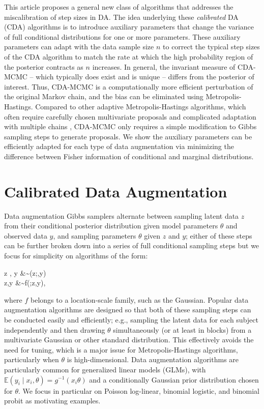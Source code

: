 \documentclass[twoside,11pt]{article}
\newcommand{\be}{\begin{equs}}
\newcommand{\ee}{\end{equs}}
\newcommand{\bb}[1]{\mathbb{#1}}
\newcommand{\1}{\mathbf 1}
\begin{document}
{This article proposes a general new class of algorithms that addresses the miscalibration of step sizes in DA. The idea underlying these {\em calibrated} DA (CDA) algorithms is to introduce auxiliary parameters that change the variance of full conditional distributions for one or more parameters. These auxiliary parameters can adapt with the data sample size $n$ to correct the typical step sizes of the CDA algorithm to match the rate at which the high probability region of the posterior contracts as $n$ increases. In general, the invariant measure of CDA-MCMC -- which typically does exist and is unique -- differs from the posterior of interest. Thus, CDA-MCMC is a computationally more efficient perturbation of the original Markov chain, and the bias can be eliminated using Metropolis-Hastings. {Compared to other adaptive Metropolis-Hastings algorithms,
which often require carefully chosen multivariate proposals and complicated adaptation with multiple chains  \citep{tran2016adaptive}, CDA-MCMC only
requires a simple modification to Gibbs sampling steps to generate proposals. We show the auxiliary parameters can be efficiently adapted for each type of data augmentation via minimizing
the difference between Fisher information of conditional and
marginal distributions.}}


\section{Calibrated Data Augmentation} \label{sec:cda}
Data augmentation Gibbs samplers alternate between sampling  latent data $z$ from their conditional posterior distribution given model parameters $\theta$ and observed data $y$, and sampling parameters $\theta$ given $z$ and $y$; either of these steps can be further broken down into a series of full conditional sampling steps but we focus for simplicity on algorithms of the form: 
\be \label{eq:da}
z \mid \theta, y &\sim \pi(z;\theta,y) \\
\theta \mid z,y &\sim f(\theta;z,y),
\ee
where $f$ belongs to a location-scale family, such as the Gaussian.  Popular data augmentation algorithms are designed so that both of these sampling steps can be conducted easily and efficiently; e.g., sampling the latent data for each subject independently and then drawing $\theta$ simultaneously (or at least in blocks) from a multivariate Gaussian or other standard distribution.  This effectively avoids the need for tuning, which is a major issue for Metropolis-Hastings algorithms, particularly when $\theta$ is high-dimensional.
Data augmentation algorithms are particularly common for generalized linear models (GLMs), with $\bb E(y_i \mid x_i, \theta) = g^{-1}(x_i \theta)$ and a conditionally Gaussian prior distribution chosen for $\theta$. We focus in particular on Poisson log-linear, binomial logistic, and binomial probit as motivating examples.
\end{document}
